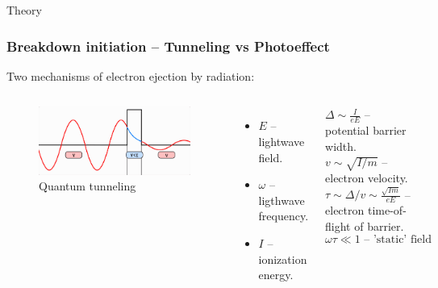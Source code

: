 \documentclass{beamer}
\begin{document}
	
	\begin{frame}[plain,c]
		
		\begin{center}
			\huge {} Theory
		\end{center}
		
	\end{frame}
	
	\begin{frame}
		\frametitle{Breakdown initiation -- Tunneling vs Photoeffect}
		Two mechanisms of electron ejection by radiation:
		\begin{columns}
			\begin{figure}
				\centering
				\includegraphics[width=\linewidth]{res/tunneling.png}
				\caption*{Quantum tunneling}
			\end{figure}
			\vspace{-10pt}
			\footnotesize
			\begin{itemize}
				\setlength\itemsep{-2pt}
				\item $E$ -- lightwave field.
				\item $\omega$ -- ligthwave frequency.
				\item $I$ -- ionization energy.
			\end{itemize}
			$\Delta \sim \frac{I}{eE}$ -- potential barrier width. \\
			$v \sim \sqrt{I/m}$ -- electron velocity. \\
			$\tau \sim \Delta / v \sim \frac{\sqrt{Im}}{eE}$ -- electron time-of-flight of barrier.
			$$\omega \tau \ll 1 \text{ -- 'static' field condition.}$$
			

\end{columns}
\end{frame}
\end{document}
